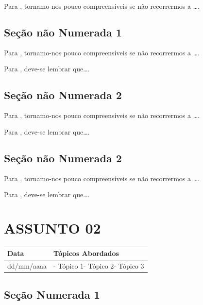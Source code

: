 \documentclass[
]{book}
\begin{document}
Para \citet{BOCK2001}, tornamo-nos pouco compreensíveis se não recorrermos a \ldots.

\hypertarget{seuxe7uxe3o-nuxe3o-numerada-1-39}{%
\subsection*{Seção não Numerada 1}\label{seuxe7uxe3o-nuxe3o-numerada-1-39}}

Para \citet{BOCK2001}, tornamo-nos pouco compreensíveis se não recorrermos a \ldots.

Para \citet{DAVIDOFF2001}, deve-se lembrar que\ldots.

\hypertarget{seuxe7uxe3o-nuxe3o-numerada-2-58}{%
\subsection*{Seção não Numerada 2}\label{seuxe7uxe3o-nuxe3o-numerada-2-58}}

Para \citet{BOCK2001}, tornamo-nos pouco compreensíveis se não recorrermos a \ldots.

Para \citet{DAVIDOFF2001}, deve-se lembrar que\ldots.

\hypertarget{seuxe7uxe3o-nuxe3o-numerada-2-59}{%
\subsection*{Seção não Numerada 2}\label{seuxe7uxe3o-nuxe3o-numerada-2-59}}

Para \citet{BOCK2001}, tornamo-nos pouco compreensíveis se não recorrermos a \ldots.

Para \citet{DAVIDOFF2001}, deve-se lembrar que\ldots.

\hypertarget{assunto-02-1}{%
\section{ASSUNTO 02}\label{assunto-02-1}}

\begin{longtable}[]{@{}ll@{}}
\toprule()
Data & Tópicos Abordados \\
\midrule()
\endhead
dd/mm/aaaa & - Tópico 1- Tópico 2- Tópico 3 \\
\bottomrule()
\end{longtable}

\hypertarget{seuxe7uxe3o-numerada-1-20}{%
\subsection{Seção Numerada 1}\label{seuxe7uxe3o-numerada-1-20}}
\end{document}
